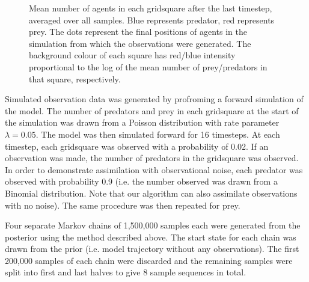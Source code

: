 \documentclass{article}
\begin{document}
\begin{figure}
	\centering
	\caption{Mean number of agents in each gridsquare after the last timestep, averaged over all samples. Blue represents predator, red represents prey. The dots represent the final positions of agents in the simulation from which the observations were generated. The background colour of each square has red/blue intensity proportional to the log of the mean number of prey/predators in that square, respectively.}
	\label{figEndState}
\end{figure}


Simulated observation data was generated by profroming a forward simulation of the model. The number of predators and prey in each gridsquare at the start of the simulation was drawn from a Poisson distribution with rate parameter $\lambda = 0.05$. The model was then simulated forward for 16 timesteps. At each timestep, each gridsquare was observed with a probability of 0.02. If an observation was made, the number of predators in the gridsquare was observed. In order to demonstrate assimilation with observational noise, each predator was observed with probability 0.9 (i.e. the number observed was drawn from a Binomial distribution. Note that our algorithm can also assimilate observations with no noise). The same procedure was then repeated for prey.

Four separate Markov chains of 1,500,000 samples each were generated from the posterior using the method described above. The start state for each chain was drawn from the prior (i.e. model trajectory without any observations). The first 200,000 samples of each chain were discarded and the remaining samples were split into first and last halves to give 8 sample sequences in total. 
\end{document}

